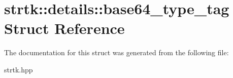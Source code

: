 \hypertarget{structstrtk_1_1details_1_1base64__type__tag}{\section{strtk\-:\-:details\-:\-:base64\-\_\-type\-\_\-tag Struct Reference}
\label{structstrtk_1_1details_1_1base64__type__tag}
}


The documentation for this struct was generated from the following file\-:\begin{DoxyCompactItemize}
\item 
strtk.\-hpp\end{DoxyCompactItemize}
